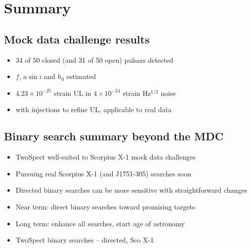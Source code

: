 \section{Summary}

\subsection{Mock data challenge results}

\begin{itemize}
\item 34 of 50 closed (and 31 of 50 open) pulsars detected
\item $f$, $a \sin i$ and $h_0$ estimated
\item $4.23\times 10^{-25}$ strain UL in $4 \times 10^{-24}$ strain Hz$^{1/2}$ noise
\item with injections to refine UL, applicable to real data
\end{itemize}

\subsection{Binary search summary beyond the MDC}
\begin{itemize}
\item TwoSpect well-suited to Scorpius X-1 mock data challenges
\item Pursuing real Scorpius X-1 (and J1751-305) searches soon
\item Directed binary searches can be more sensitive with straightforward
changes
\end{itemize}

\begin{itemize}
\item Near term: direct binary searches toward promising targets
\item Long term: enhance all searches, start age of astronomy
\item TwoSpect binary searches -- directed, Sco X-1
\end{itemize}



%
%



